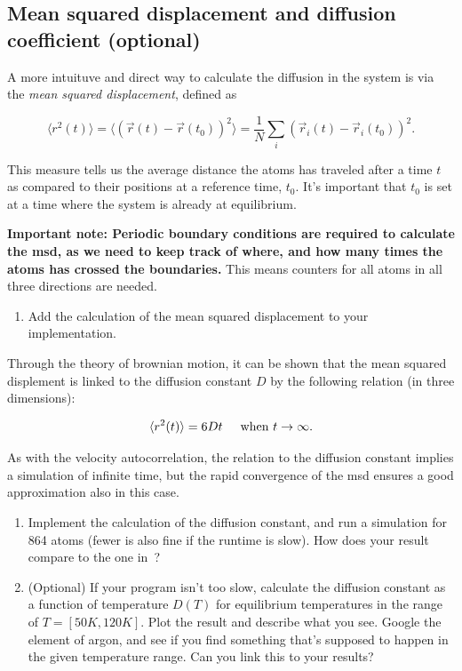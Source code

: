 \documentclass[11pt,british,a4paper]{report}
\begin{document}
\subsection{Mean squared displacement and diffusion coefficient (optional)}
A more intuituve and direct way to calculate the diffusion in the system is via the \textit{mean squared displacement}, defined as

\begin{equation}
 \langle r^2(t) \rangle = \langle (\vec{r}(t) - \vec{r}(t_0))^2 \rangle = \frac{1}{N} \sum_{i} (\vec{r}_i(t) - \vec{r}_i(t_0))^2.
 \label{eq:msd}
\end{equation}

This measure tells us the average distance the atoms has traveled after a time $t$ as compared to their positions at a reference time, $t_0$. It's important that $t_0$ is set at a time where the system is already at equilibrium.

\textbf{Important note: Periodic boundary conditions are required to calculate the msd, as we need to keep track of where, and how many times the atoms has crossed the boundaries.} This means counters for all atoms in all three directions are needed.

\begin{enumerate}[label=\roman*.]
    \item Add the calculation of the mean squared displacement to your implementation.
\end{enumerate}

Through the theory of brownian motion, it can be shown that the mean squared displement is linked to the diffusion constant $D$ by the following relation (in three dimensions):

\begin{equation}
 \langle r^2(t) \rangle = 6Dt \hspace{0.5 cm} \text{when } t \rightarrow \infty.
\end{equation}

As with the velocity autocorrelation, the relation to the diffusion constant implies a simulation of infinite time, but the rapid convergence of the msd ensures a good approximation also in this case.  

\begin{enumerate}[label=\roman*., resume]
    \item Implement the calculation of the diffusion constant, and run a simulation for 864 atoms (fewer is also fine if the runtime is slow). How does your result compare to the one in~\cite{Rahman_1964}?
    \item (Optional) If your program isn't too slow, calculate the diffusion constant as a function of temperature \(D(T)\) for equilibrium temperatures in the range of \(T = [50 K, 120K]\). Plot the result and describe what you see. Google the element of argon, and see if you find something that's supposed to happen in the given temperature range. Can you link this to your results?   
\end{enumerate}
\end{document}

